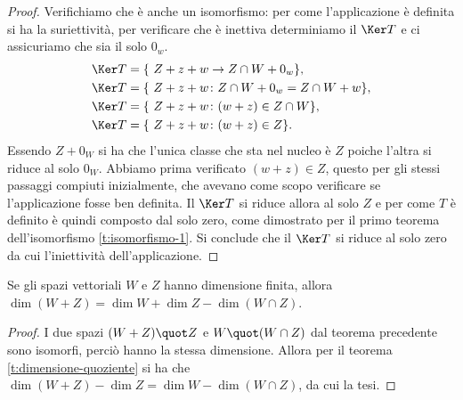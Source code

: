\begin{proof}
	Verifichiamo che è anche un isomorfismo: per come l'applicazione è definita si ha la suriettività, per verificare che è inettiva determiniamo il $\Ker T$ e ci assicuriamo che sia il solo $0_w$.
	\begin{align*}
		\Ker T&=\{\ Z +   z +   w\to Z\cap W + 0_w  \},\\
		\Ker T&=\{\ Z +   z +   w\colon Z\cap W + 0_w = Z\cap W +   w \},\\
		\Ker T&=\{\ Z +   z +   w\colon (  w +   z)\in Z\cap W \},\\
		\Ker T&=\{\ Z +   z +   w\colon (  w +  z)\in Z \}.
	\end{align*}
	Essendo $Z + 0_W$ si ha che l'unica classe che sta nel nucleo è $Z$ poiche l'altra si riduce al solo $0_W$.
	Abbiamo prima verificato $(  w +  z)\in Z$, questo per gli stessi passaggi compiuti inizialmente, che avevano come scopo verificare se l'applicazione fosse ben definita.
	Il $\Ker T$ si riduce allora al solo $Z$ e per come $T$ è definito è quindi composto dal solo zero, come dimostrato per il primo teorema dell'isomorfismo \ref{t:isomorfismo-1}.
	Si conclude che il $\Ker T$ si riduce al solo zero da cui l'iniettività dell'applicazione. 
\end{proof}
\begin{corollario}
	Se gli spazi vettoriali $W$ e $Z$ hanno dimensione finita, allora $\dim(W+Z)=\dim W+\dim Z-\dim(W\cap Z)$.
\end{corollario}
\begin{proof}
	I due spazi $(W+Z)\quot Z$ e $W\quot(W\cap Z)$ dal teorema precedente sono isomorfi, perciò hanno la stessa dimensione.
	Allora per il teorema \ref{t:dimensione-quoziente} si ha che $\dim(W+Z)-\dim Z=\dim W-\dim(W\cap Z)$, da cui la tesi.
\end{proof}

